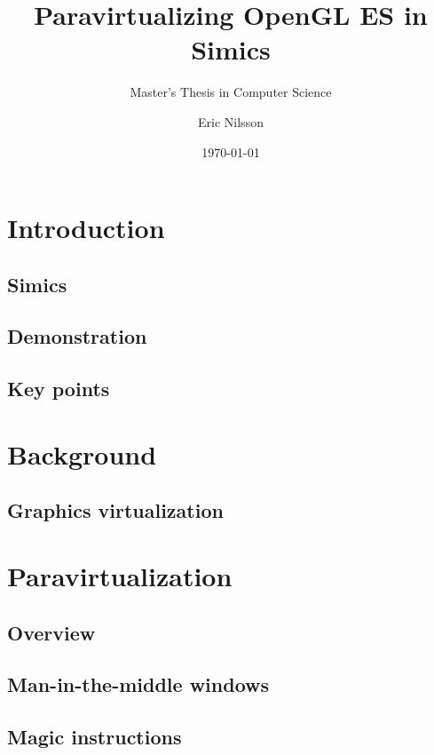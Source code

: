 \documentclass{beamer}
\title{Paravirtualizing OpenGL ES in Simics}
\subtitle{Master's Thesis in Computer Science}
\author{Eric Nilsson}
\institute{Blekinge Institute of Technology}
\date{\today} %
\begin{document}
	
	
	\section{Introduction}
	\subsection{Simics}
	
	\subsection{Demonstration}
	
	\subsection{Key points}
	

	\section{Background}
	\subsection{Graphics virtualization}
	

	\section{Paravirtualization}
	\subsection{Overview}
	
	\subsection{Man-in-the-middle windows}
	
	\subsection{Magic instructions}

\end{document}
